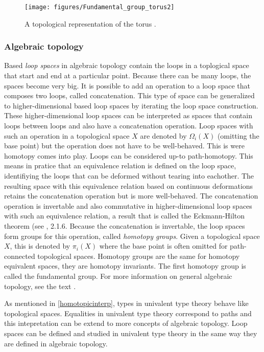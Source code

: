\documentclass[12pt,a4paper,twoside,xetex]{book} %
\newcommand{\keyword}[1]{\emph{#1}\index{#1}}
\begin{document}
\begin{figure}
\centering
\texttt{[image: figures/Fundamental\_group\_torus2]}
\caption{A topological representation of the torus \cite{Dinkelbach2005}. 
\label{torus}}
\end{figure}

\subsubsection{Algebraic topology}\label{higherhomotopy}

Based \keyword{loop spaces} in algebraic topology contain the loops in a toplogical space that start and end at a particular point. Because there can be many loops, the spaces become very big. It is possible to add an operation to a loop space that composes two loops, called concatenation. This type of space can be generalized to higher-dimensional based loop spaces by iterating the loop space construction. These higher-dimensional loop spaces can be interpreted as spaces that contain loops between loops and also have a concatenation operation. Loop spaces with such an operation in a topological space $X$ are denoted by $\Omega_i (X)$ (omitting the base point) but the operation does not have to be well-behaved. This is were homotopy comes into play. Loops can be considered up-to path-homotopy. This means in pratice that an equivalence relation is defined on the loop space, identifiying the loops that can be deformed without tearing into eachother. The resulting space with this equivalence relation based on continuous deformations retains the concatenation operation but is more well-behaved. The concatenation operation is invertable and also commutative in higher-dimensional loop spaces with such an equivalence relation, a result that is called the Eckmann-Hilton theorem (see \cite{Voevodsky2013}, 2.1.6. Because the concatenation is invertable, the loop spaces form groups for this operation, called \keyword{homotopy groups}. Given a topological space $X$, this is denoted by $\pi_i(X)$ where the base point is often omitted for path-connected topological spaces. Homotopy groups are the same for homotopy equivalent spaces, they are homotopy invariants. The first homotopy group is called the fundamental group. For more information on general 
algebraic topology, see the text \cite{Hatcher2001}.


As mentioned in \cref{homotopicinterp}, types in univalent type theory behave like topological spaces. Equalities in univalent type theory correspond to paths and this intepretation can be extend to more concepts of algebraic topology. Loop spaces can be defined and studied in univalent type theory in the same way they are defined in algebraic topology. 
\end{document}
